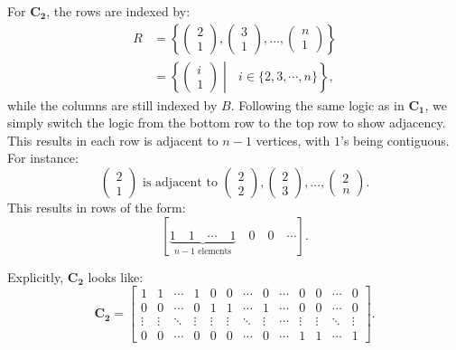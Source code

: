 \documentclass{article}
\begin{document}
For \( \mathbf{C_2} \), the rows are indexed by:
\begin{align*}
R &= \left\{\begin{pmatrix} 2 \\ 1 \end{pmatrix}, \begin{pmatrix} 3 \\ 1 \end{pmatrix}, \dots, \begin{pmatrix} n \\ 1 \end{pmatrix}\right\} \\
&= \left\{\begin{pmatrix}i \\ 1\end{pmatrix}\middle |\text{ }i\in\{2,3,\cdots,n\}\right\},
\end{align*}
while the columns are still indexed by \(B\). Following the same logic as in \(\mathbf{C_1}\), we simply switch the logic from the bottom row to the top row to show adjacency.\\

This results in each row is adjacent to \( n-1 \) vertices, with \( 1 \)'s being contiguous. For instance:
\[
\begin{pmatrix} 2 \\ 1 \end{pmatrix} \text{ is adjacent to } \begin{pmatrix} 2 \\ 2 \end{pmatrix}, \begin{pmatrix} 2 \\ 3 \end{pmatrix}, \dots, \begin{pmatrix} 2 \\ n \end{pmatrix}.
\]
This results in rows of the form:
\[
[\underbrace{1 \quad 1 \quad \cdots \quad 1}_{n-1 \text{ elements}} \quad 0 \quad 0 \quad \cdots].
\]

Explicitly, \( \mathbf{C_2} \) looks like:
\[
\mathbf{C_2} = 
\begin{bmatrix}
1 & 1 & \cdots & 1 & 0 & 0 & \cdots & 0 & \cdots & 0 & 0 & \cdots & 0 \\
0 & 0 & \cdots & 0 & 1 & 1 & \cdots & 1 & \cdots & 0 & 0 & \cdots & 0 \\
\vdots & \vdots & \ddots & \vdots & \vdots & \vdots & \ddots & \vdots & \cdots & \vdots & \vdots & \ddots & \vdots \\
0 & 0 & \cdots & 0 & 0 & 0 & \cdots & 0 & \cdots & 1 & 1 & \cdots & 1
\end{bmatrix}.
\]
\end{document}
